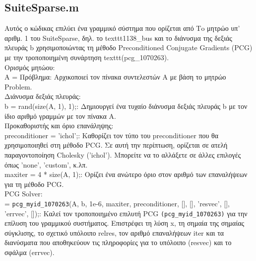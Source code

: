 \documentclass[12pt,a4paper]{article}
\begin{document}
\subsection{SuiteSparse.m}
Αυτός ο κώδικας επιλύει ένα γραμμικό σύστημα που ορίζεται από Τo μητρώο υπ’ αριθμ. 1 του SuiteSparse, δηλ. το texttt{1138\_bus} και το διάνυσμα της δεξιάς πλευράς b χρησιμοποιώντας τη μέθοδο Preconditioned Conjugate Gradients (PCG) με την τροποποιημένη συνάρτηση texttt{(pcg\_1070263)}. \\
Ορισμός μητώου:\\
A = Πρόβλημα: Αρχικοποιεί τον πίνακα συντελεστών A με βάση το μητρώο Problem. \\

Διάνυσμα δεξιάς πλευράς:\\
b = rand(size(A, 1), 1);: Δημιουργεί ένα τυχαίο διάνυσμα δεξιάς πλευράς b με τον ίδιο αριθμό γραμμών με τον πίνακα A.\\

Προκαθοριστής και όριο επανάληψης:\\
preconditioner = 'ichol';: Καθορίζει τον τύπο του preconditioner που θα χρησιμοποιηθεί στη μέθοδο PCG. Σε αυτή την περίπτωση, ορίζεται σε ατελή παραγοντοποίηση Cholesky ('ichol'). Μπορείτε να το αλλάξετε σε άλλες επιλογές όπως 'none', 'custom', κ.λπ. \\
maxiter = 4 * size(A, 1);: Ορίζει ένα ανώτερο όριο στον αριθμό των επαναλήψεων για τη μέθοδο PCG.\\

PCG Solver:\\
[x, flag, relres, iter, resvec, errvec] = \texttt{pcg\_myid\_1070263}(A, b, 1e-6, maxiter, preconditioner, [], [], 'resvec', [], 'errvec', []);:  Καλεί τον τροποποιημένο επιλυτή PCG \texttt{(pcg\_myid\_1070263)} για την επίλυση του γραμμικού συστήματος. Επιστρέφει τη λύση x, τη σημαία της σημαίας σύγκλισης, το σχετικό υπόλοιπο relres, τον αριθμό επαναλήψεων iter και τα διανύσματα που αποθηκεύουν τις πληροφορίες για το υπόλοιπο (resvec) και το σφάλμα (errvec).
\end{document}
